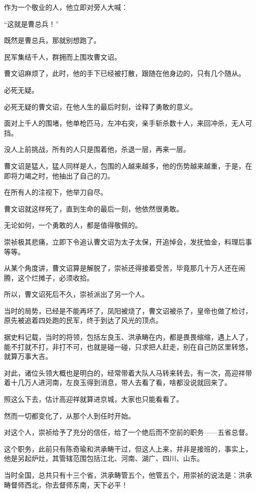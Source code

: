 \begin{multicols}{\theparacolNo}
作为一个敬业的人，他立即对旁人大喊：

“这就是曹总兵！”

既然是曹总兵，那就别想跑了。

民军集结千人，群拥而上围攻曹文诏。

曹文诏麻烦了，此时，他的手下已经被打散，跟随在他身边的，只有几个随从。

必死无疑。

必死无疑的曹文诏，在他人生的最后时刻，诠释了勇敢的意义。

面对上千人的围堵，他单枪匹马，左冲右突，亲手斩杀数十人，来回冲杀，无人可挡。

没人上前挑战，所有的人只是围着他，杀退一层，再来一层。

曹文诏是猛人，猛人同样是人，包围的人越来越多，他的伤势越来越重，于是，在即将力竭之时，他抽出了自己的刀。

在所有人的注视下，他举刀自尽。

曹文诏就这样死了，直到生命的最后一刻，他依然很勇敢。

无论如何，一个勇敢的人，都是值得敬佩的。

崇祯极其悲痛，立即下令追认曹文诏为太子太保，开追悼会，发抚恤金，料理后事等等。

从某个角度讲，曹文诏算是解脱了，崇祯还得接着受苦，毕竟那几十万人还在闹腾，这个烂摊子，必须收拾。

所以，曹文诏死后不久，崇祯派出了另一个人。

当时的局势，已经是不能再坏了，凤阳被烧了，曹文诏被杀了，皇帝也做了检讨，原先被追着四处跑的民军，终于到达了风光的顶点。

据史料记载，当时的将领，包括左良玉、洪承畴在内，都是畏畏缩缩，遇上人了，能不打就不打，非打不可，也就是碰一碰，只求把人赶走，别在自己防区里转悠，就算万事大吉。

对此，诸位头领大概也是明白的，经常带着大队人马转来转去，有一次，高迎祥带着十几万人进河南，左良玉得到消息，带人去看了看，啥都没说就回来了。

照这么下去，估计高迎祥就算进京城，大家也只能看看了。

然而一切都变化了，从那个人到任时开始。

对这个人，崇祯给予了充分的信任，给了一个绝后而不空前的职务——五省总督。

这个职务，此前只有陈奇瑜和洪承畴干过，但这人上来，并非是接班的，事实上，他是另起炉灶，其管辖范围包括江北、河南、湖广、四川、山东。

当时全国，总共只有十三个省，洪承畴管五个，他管五个，用崇祯的说法是：洪承畴督师西北，你去督师东南，天下必平！


\end{multicols}
